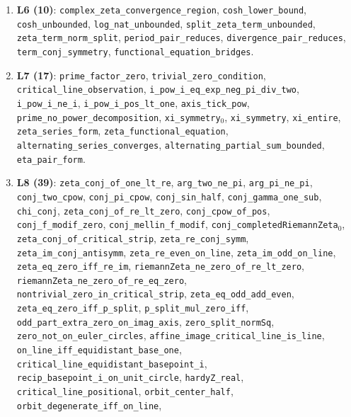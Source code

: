 \documentclass{article}
\begin{document}
{\begin{sloppypar}
\begin{enumerate}
\texttt{leak\_sign\_is\_unit\_square}, \texttt{unit\_1\_on\_real\_circle},
\texttt{unit\_j\_on\_imag\_circle}, \texttt{real\_circle\_is\_direction\_1},
\texttt{imag\_circle\_is\_direction\_j}, \texttt{directions\_orthogonal},
\texttt{euler\_plane}.
\item \textbf{L6 (10)}: \texttt{complex\_zeta\_convergence\_region},
\texttt{cosh\_lower\_bound}, \texttt{cosh\_unbounded},
\texttt{log\_nat\_unbounded}, \texttt{split\_zeta\_term\_unbounded},
\texttt{zeta\_term\_norm\_split}, \texttt{period\_pair\_reduces},
\texttt{divergence\_pair\_reduces}, \texttt{term\_conj\_symmetry},
\texttt{functional\_equation\_bridges}.
\item \textbf{L7 (17)}: \texttt{prime\_factor\_zero},
\texttt{trivial\_zero\_condition}, \texttt{critical\_line\_observation},
\texttt{i\_pow\_i\_eq\_exp\_neg\_pi\_div\_two}, \texttt{i\_pow\_i\_ne\_i},
\texttt{i\_pow\_i\_pos\_lt\_one}, \texttt{axis\_tick\_pow},
\texttt{prime\_no\_power\_decomposition}, \texttt{xi\_symmetry}\(_0\),
\texttt{xi\_symmetry}, \texttt{xi\_entire}, \texttt{zeta\_series\_form},
\texttt{zeta\_functional\_equation}, \texttt{alternating\_series\_converges},
\texttt{alternating\_partial\_sum\_bounded}, \texttt{eta\_pair\_form}.
\item \textbf{L8 (39)}: \texttt{zeta\_conj\_of\_one\_lt\_re},
\texttt{arg\_two\_ne\_pi}, \texttt{arg\_pi\_ne\_pi}, \texttt{conj\_two\_cpow},
\texttt{conj\_pi\_cpow}, \texttt{conj\_sin\_half}, \texttt{conj\_gamma\_one\_sub},
\texttt{chi\_conj}, \texttt{zeta\_conj\_of\_re\_lt\_zero},
\texttt{conj\_cpow\_of\_pos}, \texttt{conj\_f\_modif\_zero},
\texttt{conj\_mellin\_f\_modif}, \texttt{conj\_completedRiemannZeta}\(_0\),
\texttt{zeta\_conj\_of\_critical\_strip}, \texttt{zeta\_re\_conj\_symm},
\texttt{zeta\_im\_conj\_antisymm}, \texttt{zeta\_re\_even\_on\_line},
\texttt{zeta\_im\_odd\_on\_line}, \texttt{zeta\_eq\_zero\_iff\_re\_im},
\texttt{riemannZeta\_ne\_zero\_of\_re\_lt\_zero},
\texttt{riemannZeta\_ne\_zero\_of\_re\_eq\_zero},
\texttt{nontrivial\_zero\_in\_critical\_strip}, \texttt{zeta\_eq\_odd\_add\_even},
\texttt{zeta\_eq\_zero\_iff\_p\_split}, \texttt{p\_split\_mul\_zero\_iff},
\texttt{odd\_part\_extra\_zero\_on\_imag\_axis}, \texttt{zero\_split\_normSq},
\texttt{zero\_not\_on\_euler\_circles},
\texttt{affine\_image\_critical\_line\_is\_line},
\texttt{on\_line\_iff\_equidistant\_base\_one},
\texttt{critical\_line\_equidistant\_basepoint\_i},
\texttt{recip\_basepoint\_i\_on\_unit\_circle}, \texttt{hardyZ\_real},
\texttt{critical\_line\_positional}, \texttt{orbit\_center\_half},
\texttt{orbit\_degenerate\_iff\_on\_line},

\end{enumerate}
\end{sloppypar}}
\end{document}
